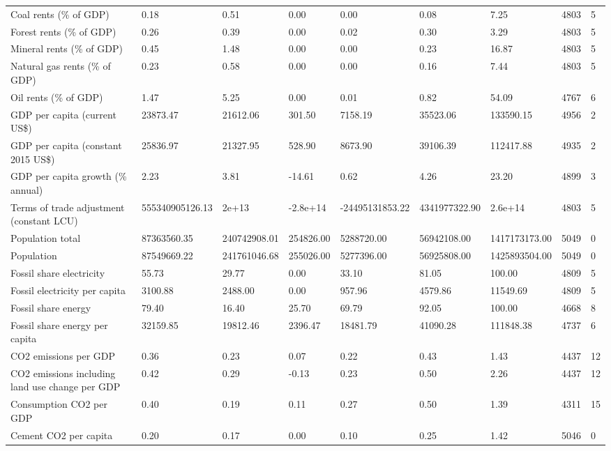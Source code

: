 \begin{longtable}{lllllllll}
Coal rents (\% of GDP) & 0.18 & 0.51 & 0.00 & 0.00 & 0.08 & 7.25 & 4803 & 5\\
Forest rents (\% of GDP) & 0.26 & 0.39 & 0.00 & 0.02 & 0.30 & 3.29 & 4803 & 5\\
\addlinespace
Mineral rents (\% of GDP) & 0.45 & 1.48 & 0.00 & 0.00 & 0.23 & 16.87 & 4803 & 5\\
Natural gas rents (\% of GDP) & 0.23 & 0.58 & 0.00 & 0.00 & 0.16 & 7.44 & 4803 & 5\\
Oil rents (\% of GDP) & 1.47 & 5.25 & 0.00 & 0.01 & 0.82 & 54.09 & 4767 & 6\\
GDP per capita (current US\$) & 23873.47 & 21612.06 & 301.50 & 7158.19 & 35523.06 & 133590.15 & 4956 & 2\\
GDP per capita (constant 2015 US\$) & 25836.97 & 21327.95 & 528.90 & 8673.90 & 39106.39 & 112417.88 & 4935 & 2\\
\addlinespace
GDP per capita growth (\% annual) & 2.23 & 3.81 & -14.61 & 0.62 & 4.26 & 23.20 & 4899 & 3\\
Terms of trade adjustment (constant LCU) & 555340905126.13 & 2e+13 & -2.8e+14 & -24495131853.22 & 4341977322.90 & 2.6e+14 & 4803 & 5\\
Population total & 87363560.35 & 240742908.01 & 254826.00 & 5288720.00 & 56942108.00 & 1417173173.00 & 5049 & 0\\
Population & 87549669.22 & 241761046.68 & 255026.00 & 5277396.00 & 56925808.00 & 1425893504.00 & 5049 & 0\\
Fossil share electricity & 55.73 & 29.77 & 0.00 & 33.10 & 81.05 & 100.00 & 4809 & 5\\
\addlinespace
Fossil electricity per capita & 3100.88 & 2488.00 & 0.00 & 957.96 & 4579.86 & 11549.69 & 4809 & 5\\
Fossil share energy & 79.40 & 16.40 & 25.70 & 69.79 & 92.05 & 100.00 & 4668 & 8\\
Fossil share energy per capita & 32159.85 & 19812.46 & 2396.47 & 18481.79 & 41090.28 & 111848.38 & 4737 & 6\\
CO2 emissions per GDP & 0.36 & 0.23 & 0.07 & 0.22 & 0.43 & 1.43 & 4437 & 12\\
CO2 emissions including land use change per GDP & 0.42 & 0.29 & -0.13 & 0.23 & 0.50 & 2.26 & 4437 & 12\\
\addlinespace
Consumption CO2 per GDP & 0.40 & 0.19 & 0.11 & 0.27 & 0.50 & 1.39 & 4311 & 15\\
Cement CO2 per capita & 0.20 & 0.17 & 0.00 & 0.10 & 0.25 & 1.42 & 5046 & 0\\

\end{longtable}
